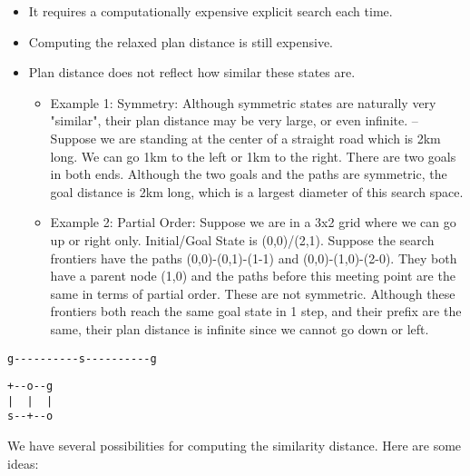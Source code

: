 \begin{itemize}
\item It requires a computationally expensive explicit search each time.
\item Computing the relaxed plan distance is still expensive.
\item Plan distance does not reflect how similar these states are.
\begin{itemize}
\item Example 1: Symmetry: Although symmetric states are naturally very
"similar", their plan distance may be very large, or even
infinite. -- Suppose we are standing at the center of a straight
road which is 2km long. We can go 1km to the left or 1km to the
right. There are two goals in both ends. Although the two goals and the
paths are symmetric, the goal distance is 2km long, which is a largest
diameter of this search space.
\item Example 2: Partial Order: Suppose we are in a 3x2 grid where we can go
up or right only. Initial/Goal State is (0,0)/(2,1). Suppose the search
frontiers have the paths (0,0)-(0,1)-(1-1) and (0,0)-(1,0)-(2-0).
They both have a parent node
(1,0) and the paths before this meeting point are the same in terms of
partial order. These are not symmetric. Although these frontiers both reach
the same goal state in 1 step, and their prefix are the same, their
plan distance is infinite since we cannot go down or left.
\end{itemize}
\end{itemize}

\begin{verbatim}
g----------s----------g
\end{verbatim}

\begin{verbatim}
+--o--g
|  |  |
s--+--o
\end{verbatim}

We have several possibilities for computing the similarity distance. Here
are some ideas:

